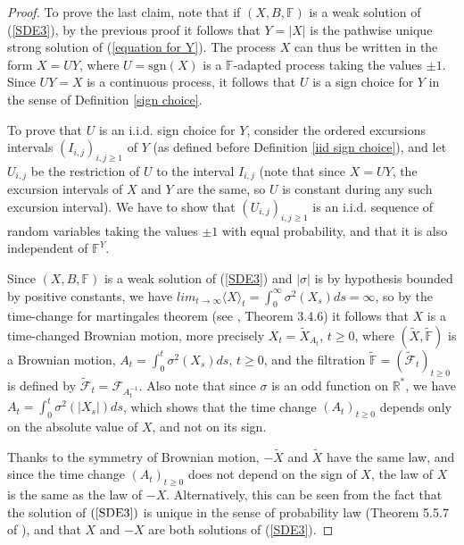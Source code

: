 \documentclass[reqno]{amsart}
\theoremstyle{definition}
\theoremstyle{remark}
\numberwithin{equation}{section}
\begin{document}
\begin{proof}
To prove the last claim, note that if $\left( X,B,\mathbb{F}\right) $ is a weak solution of (\ref{SDE3}), by the previous proof it follows that $Y=\left\vert X\right\vert$ is the pathwise unique strong solution of (\ref{equation for Y}). The process $X$ can thus be written in the form $X=U Y $, where $U=\mathrm{sgn}(X)$ is a $\mathbb{F}$-adapted process taking the values $\pm1$. Since $U Y=X$ is a continuous process,  it follows that $U$ is a sign choice for $Y$ in the sense of Definition \ref{sign choice}.

To prove that $U$ is an i.i.d. sign choice for $Y$, consider the ordered excursions intervals $(I_{i,j})_{i,j\geq 1}$ of $Y$ (as defined before Definition \ref{iid sign choice}),  and let $U_{i,j}$ be the restriction of $U$ to the interval $I_{i,j}$ (note that since $X=U Y$, the excursion intervals of $X$ and $Y$ are the same, so $U$ is constant during any such excursion interval). We have to show that $(U_{i,j})_{i,j\geq 1}$ is an i.i.d. sequence of random variables taking the values $\pm1$ with equal probability, and that it is also independent of $\mathbb{F}^Y$.

Since $(X,B,\mathbb{F})$ is a weak solution of (\ref{SDE3}) and $\vert \sigma\vert$ is by hypothesis bounded by positive constants, we have $lim_{t\rightarrow \infty} \langle X\rangle_t=\int_0^\infty \sigma^2(X_s) ds=\infty$, so by the time-change for martingales theorem (see \cite{Karatzas-Shreve}, Theorem 3.4.6) it follows that $X$ is a time-changed Brownian motion, more precisely $X_t=\widetilde{X}_{A_t}$, $t \ge 0$, where $(\widetilde{X},\widetilde{\mathbb{F}})$ is a Brownian motion, $A_t=\int_0^t \sigma^2(X_s) ds$, $t\ge 0$, and the filtration $\widetilde{\mathbb{F}}=(\widetilde{\mathcal{F}}_t)_{t\ge 0}$ is defined by $\widetilde{\mathcal{F}}_t={{\mathcal{F}}_{A_t^{-1}}}$. Also note that since $\sigma$ is an odd function on $\mathbb{R}^{\ast}$, we have $A_t=\int_0^t \sigma^2(\vert X_s\vert) ds$, which shows that the time change $(A_t)_{t\ge0}$ depends  only on the absolute value of $X$, and not on its sign.

Thanks to the symmetry of Brownian motion, $-\widetilde{X}$ and $\widetilde{X}$ have the same law, and since the time change $(A_t)_{t\ge 0}$ does not depend on the sign of $X$, the law of $X$ is the same as the law of $-X$. Alternatively, this can be seen from the fact that the solution of $(\ref{SDE3})$ is unique in the sense of probability law (Theorem 5.5.7 of \cite{Karatzas-Shreve}), and that $X$ and $-X$ are both solutions of (\ref{SDE3}).


\end{proof}
\end{document}
